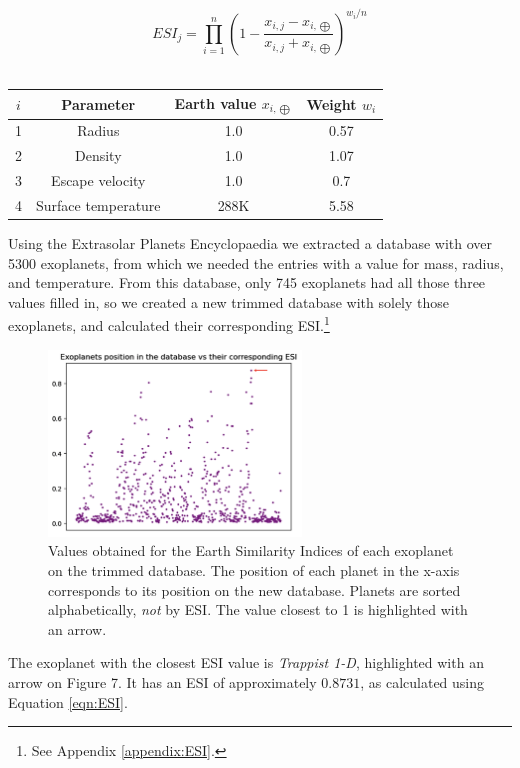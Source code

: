 \documentclass{article}[11pt]
\begin{document}
\begin{equation}\label{eqn:ESI}
ESI_j=\prod^n_{i=1}{\left(1-\frac{x_{i,j}-x_{i,\bigoplus}}{x_{i,j}+x_{i,\bigoplus}}\right)^{w_i/n}}
\end{equation}
\\
\begin{center}
\begin{tabular}{||c|c|c|c||}
\hline
$i$ & \textbf{Parameter} & \textbf{Earth value} $x_{i,\bigoplus}$ & \textbf{Weight} $w_i$ \\
\hline
1 & Radius  & 1.0  & 0.57 \\
\hline
2 & Density  & 1.0 & 1.07 \\
\hline
3 & Escape velocity  & 1.0 & 0.7 \\
\hline
4 & Surface temperature & 288K & 5.58 \\
\hline
\end{tabular}
\end{center} 

Using the Extrasolar Planets Encyclopaedia\cite{EPE} we extracted a database with over 5300 exoplanets, from which we needed the entries with a value for mass, radius, and temperature. From this database, only 745 exoplanets had all those three values filled in, so we created a new trimmed database with solely those exoplanets, and calculated their corresponding ESI.\footnote{See Appendix \ref{appendix:ESI}.}

\begin{figure}[H]
\centering
\includegraphics[width=0.6\textwidth]{Pictures/esiplot.png}
\caption{Values obtained for the Earth Similarity Indices of each exoplanet on the trimmed database. The position of each planet in the x-axis corresponds to its position on the new database. Planets are sorted alphabetically, \emph{not} by ESI. The value closest to 1 is highlighted with an arrow.}
\label{fig:ESIplot}
\end{figure}

The exoplanet with the closest ESI value is \textit{Trappist 1-D}, highlighted with an arrow on Figure 7. It has an ESI of approximately $0.8731$, as calculated using Equation \ref{eqn:ESI}.
\end{document}
